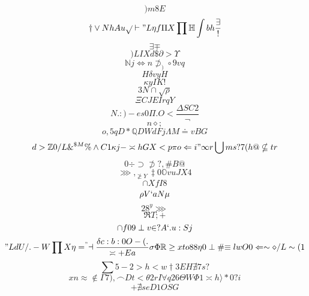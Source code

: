 \documentclass[12pt]{article}
\begin{document}
        \begin{minipage}[t][0pt]{\linewidth}

        \[)m8E\]
\[\dagger\lor N h A u\sqrt{}\vdash " L {\eta f}\Pi X\prod\mathbb{H}\int b h\frac{\exists}{ !}\]
\[\exists\mp\]
\[)LIXd\$\partial >\Upsilon\]
\[\mathbb{N} j\iff n\not\supset_{)}\circ 9 v q\]
\[H\delta v y H\]
\[\kappa y I K !\]
\[3N\cap\sqrt{\rho}\]
\[\Xi C J E I r q Y\]
\[N.:)-es0\Pi . O <\frac{\Delta S C 2}{\neg}\]
\[n\diamond ;\]
\[o,5qD*\mathbb{Q} D W d F j\Lambda M\doteq v B G\]
\[d>\mathbb{Z} 0 / L\&^{\$ M}\%\land C 1\kappa j -\asymp h G X < p\pi o\Leftarrow i "\infty r\bigcup m s ? 7 ( h @\nsubseteq t r\]
\[0 {\div}\supset\not\supset ? ,\# B @\]
\[\ggg ,_{\ngeq Y}\ddagger 0\mathbb{O} {vuJX4}\]
\[\cap X f I 8\]
\[\rho V ` a N\mu\]
\[28^{y}\ggg\]
\[\Re T ; +\]
\[\cap f 0 9\perp v {\in ? A ` . u : S j}\]
\["LdU/.-W\prod X\eta =^{"}\dashv\frac{\delta c : b : 0 O - ( .}{\asymp + E a}\sigma\Phi\mathbb{R}\geq x t o 8 8\eta 0\perp\# {\equiv l w O 0}\Leftarrow\sim\diamond / L\sim ( 1\]
\[\sum 5 - 2 > h < w\dagger 3 E H\nexists 7 s ?\]
\[xn\approx\notin\Gamma 7 ) ,\frown D t <\theta 2 r I\forall q 2 6 {\Theta W}\Phi 1\asymp h\rangle * 0 ? i\]
\[+\nexists s e D 1 O S G
        \]
\end{minipage}
\end{document}
